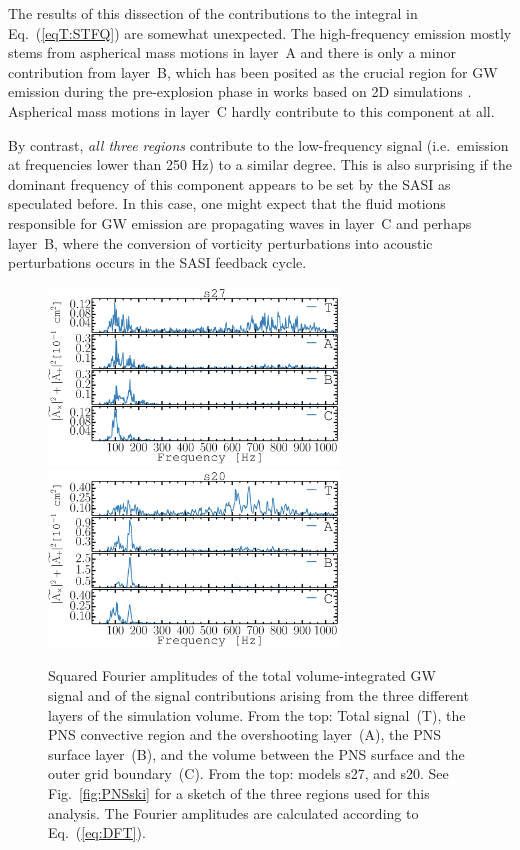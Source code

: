 The results of this dissection of the
contributions to the integral in Eq.~(\ref{eqT:STFQ}) are somewhat
unexpected.
The high-frequency emission  mostly stems from aspherical
mass motions in layer~A and there is only a
minor contribution from layer~B, which has been posited as
the crucial region for GW emission during the pre-explosion phase in
works based on 2D simulations \citep{marek_08,murphy_09,mueller_13}.
Aspherical mass motions in layer~C hardly contribute
to this component at all.

By contrast, \emph{all three regions} contribute to the low-frequency
signal (i.e.\ emission at frequencies lower than 250 Hz) to a similar degree. This is also surprising
if the dominant frequency of this component appears to be set by the SASI
as speculated before. In this case, one might expect that
the fluid motions responsible for GW emission are propagating
waves in layer~C and perhaps layer~B,
where the conversion of vorticity perturbations into acoustic
perturbations occurs in the SASI feedback cycle. 
\begin{figure}
\centering
\includegraphics[width=0.69\textwidth]{./images/paper1/fig6a.pdf}
\includegraphics[width=0.69\textwidth]{./images/paper1/fig6b.pdf} \\
\caption{Squared Fourier amplitudes of the total volume-integrated GW
  signal and of the signal contributions arising from the three different
  layers of the simulation volume.  
  From the top: Total signal~(T), 
  the PNS convective region and the overshooting layer~(A), the PNS surface layer~(B),
  and the volume between the PNS surface and the outer grid boundary~(C).  
  From the top: models s27, and s20.
  See Fig.~\ref{fig:PNSski} for a sketch of the three
  regions used for this analysis. The Fourier amplitudes are calculated according to
  Eq.~(\ref{eq:DFT}). 
\label{fig:cuts}}
\end{figure}

